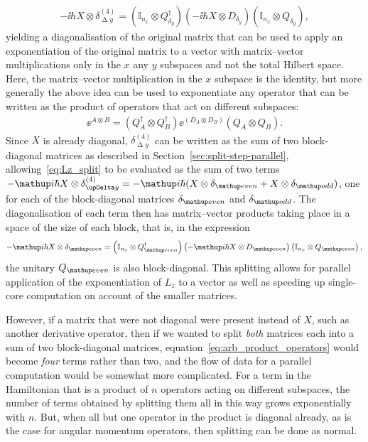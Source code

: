 \begin{enumerate}
    \begin{align}\label{eq:Lz_split}
        -\ii\hbar X \otimes \delta^{(4)}_{\upDelta y}
        = \left(\mathbb{I}_{n_x} \otimes Q_{\delta_y}^\dagger\right)
        \left(-\ii\hbar X \otimes  D_{\delta_y}\right)
        \left(\mathbb{I}_{n_x} \otimes Q_{\delta_y}\right),
    \end{align}
yielding a diagonalisation of the original matrix that can be used to apply an exponentiation of the original matrix to a vector with matrix--vector multiplications only in the $x$ any $y$ subspaces and not the total Hilbert space. Here, the matrix--vector multiplication in the $x$ subspace is the identity, but more generally the above idea can be used to exponentiate any operator that can be written as the product of operators that act on different subspaces:
\begin{align}\label{eq:arb_product_operators}
\ee^{A \otimes B} =
\left(Q^\dagger_A \otimes Q^\dagger_B\right)
\ee^{\left(D_A \otimes D_B\right)}
\left(Q_A \otimes Q_B\right).
\end{align}
Since $X$ is already diagonal, $\delta^{(4)}_{\upDelta y}$ can be written as the sum of two block-diagonal matrices as described in Section~\ref{sec:split-step-parallel}, allowing~\eqref{eq:Lz_split} to be evaluated as the sum of two terms $-\ii\hbar X \otimes \delta^{(4)}_{\upDelta y} = -\ii\hbar (X \otimes \delta_\up{even} + X \otimes \delta_\up{odd})$, one for each of the block-diagonal matrices $\delta_\up{even}$ and $\delta_\up{odd}$. The diagonalisation of each term then has matrix--vector products taking place in a space of the size of each block, that is, in the expression
\begin{align}
-\ii\hbar X \otimes \delta_\up{even} = \left(\mathbb{I}_{n_x} \otimes Q_\up{even}^\dagger\right)
        \left(-\ii\hbar X \otimes  D_\up{even}\right)
        \left(\mathbb{I}_{n_x} \otimes Q_\up{even}\right),
\end{align}
the unitary $Q_\up{even}$ is also block-diagonal. This splitting allows for parallel application of the exponentiation of $L_z$ to a vector as well as speeding up single-core computation on account of the smaller matrices.

However, if a matrix that were not diagonal were present instead of $X$, such as another derivative operator, then if we wanted to split \emph{both} matrices each into a sum of two block-diagonal matrices, equation~\eqref{eq:arb_product_operators} would become \emph{four} terms rather than two, and the flow of data for a parallel computation would be somewhat more complicated. For a term in the Hamiltonian that is a product of $n$ operators acting on different subspaces, the number of terms obtained by splitting them all in this way grows exponentially with $n$. But, when all but one operator in the product is diagonal already, as is the case for angular momentum operators, then splitting can be done as normal.

\end{enumerate}

